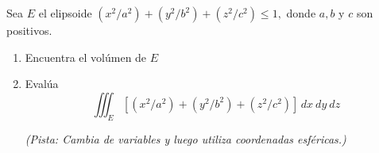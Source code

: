 Sea $E$ el elipsoide $(x^2 / a^2) + (y^2 / b^2) + (z^2 / c^2) \leq 1,$ donde $a, b$ y $c$ son positivos.

\begin{enumerate}[label=(\alph*), itemsep=0.4em, topsep=0.5em]
	\item Encuentra el volúmen de $E$
	\item Evalúa
		\[\iiint_E [(x^2 / a^2) + (y^2 / b^2) + (z^2 / c^2)]\, dx \ dy \ dz\]
		
		\textit{(Pista: Cambia de variables y luego utiliza coordenadas esféricas.)}
\end{enumerate}
